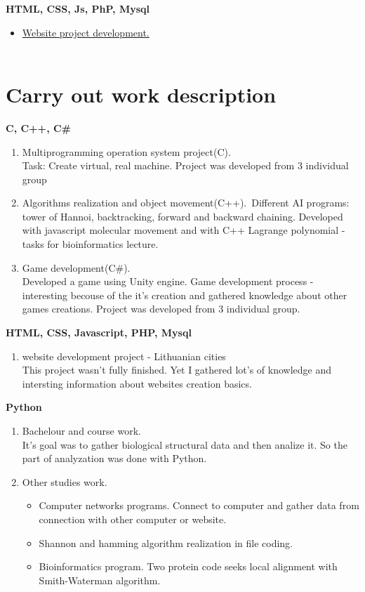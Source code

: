 \documentclass[a4paper,12pt]{article}
\begin{document}
\textbf{HTML, CSS, Js, PhP, Mysql}
\begin{itemize}
	\item 	\href{https://github.com/Luksys5/LT_programos/tree/Tinklapiai}{Website project development.}\\\\ 
\end{itemize}

\clearpage

\section{Carry out work description}

\textbf{C, C++, C\#}
\begin{enumerate}
	\item Multiprogramming operation system project(C). \\
	Task: Create virtual, real machine. Project was developed from 3 individual group
	\item Algorithms realization and object movement(C++).\ Different AI programs: tower of Hannoi, backtracking, forward and backward chaining. Developed with javascript molecular movement and with C++ Lagrange polynomial - tasks for bioinformatics lecture.
	\item Game development(C\#).\\
	Developed a game using Unity engine. Game development process - interesting becouse of the it's creation and gathered knowledge about other games creations.
Project was developed from 3 individual group.

\end{enumerate}
	

\textbf{HTML, CSS, Javascript, PHP, Mysql }
\begin{enumerate}
	\item website development project - Lithuanian cities\\
	This project wasn't fully finished. Yet I gathered lot's of knowledge and intersting information about websites creation basics. 
\end{enumerate}

\textbf{Python}
\begin{enumerate}
	\item Bachelour and course work.\\
	It's goal was to gather biological structural data and then analize it. So the part of analyzation was done with Python.
	\item Other studies work.
		\begin{itemize}
			\item Computer networks programs. Connect to computer and gather data from connection with other computer or website.
			\item Shannon and hamming algorithm realization in file coding. 
			\item Bioinformatics program. Two protein code seeks local alignment with Smith-Waterman algorithm.
		\end{itemize}

\end{enumerate}
\end{document}
